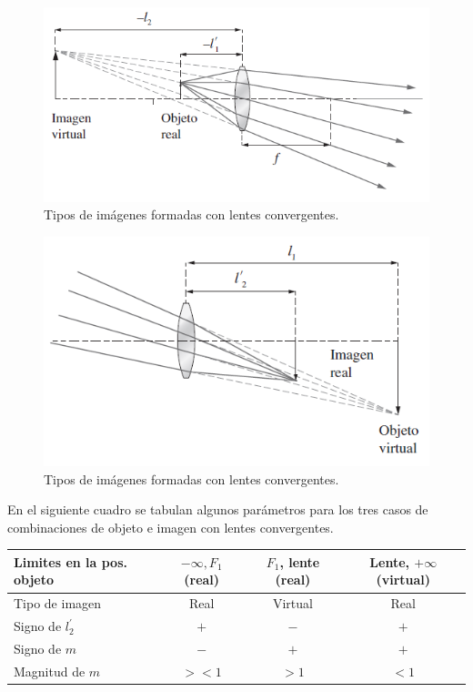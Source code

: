 \documentclass[14pt]{extarticle}
\begin{document}
\begin{figure}[H]
    \centering
    \includegraphics[scale=0.8]{Imagenes/Lentes_07b.png}
    \caption{Tipos de imágenes formadas con lentes convergentes.}
    \label{fig:figura_II_06b}
\end{figure}
\begin{figure}[H]
    \centering
    \includegraphics[scale=0.8]{Imagenes/Lentes_07c.png}
    \caption{Tipos de imágenes
formadas con lentes convergentes.}
    \label{fig:figura_II_06c}
\end{figure}
En el siguiente cuadro se tabulan algunos parámetros para los tres casos de combinaciones de objeto e imagen con lentes convergentes.
\begin{table}[H]
    \centering
    \begin{tabular}{l c c c}
        Limites en la pos. objeto & $-\infty, F_{1}$ (real) & $F_{1}$, lente (real) & Lente, $+\infty$ (virtual) \\ \hline
        Tipo de imagen & Real & Virtual & Real \\
        Signo de $l_{2}^{\prime}$ & $+$ & $-$ & $+$ \\
        Signo de $m$ & $-$ & $+$ & $+$ \\
        Magnitud de $m$ & $>< 1$ & $> 1$ & $< 1$        
    \end{tabular}
\end{table}
\end{document}
